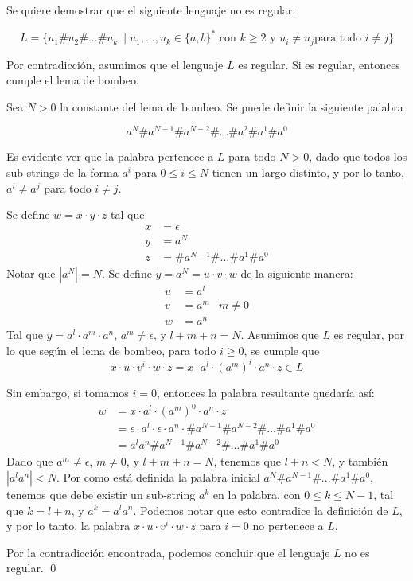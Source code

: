 \documentclass[letter]{article}
\begin{document}
\begin{pregunta}{2}
Se quiere demostrar que el siguiente lenguaje no es regular:

$$L = \{u_1\#u_2\# ... \#u_k \| u_1, ..., u_k \in \{a, b\}^* \text{ con } k \geq 2 \text{ y } u_i \neq u_j \text{para todo } i \neq j \}$$

Por contradicción, asumimos que el lenguaje $L$ es regular. Si es regular, entonces cumple el lema de bombeo.

Sea $N > 0$ la constante del lema de bombeo. Se puede definir la siguiente palabra

$$a^N \# a^{N - 1} \# a^{N - 2} \# ... \# a^2 \# a^1 \# a^0$$

Es evidente ver que la palabra pertenece a $L$ para todo $N > 0$, dado que todos los sub-strings de la forma $a^i$ para $0 \leq i \leq N$ tienen un largo distinto, y por lo tanto, $a^i \neq a^j$ para todo $i \neq j$.

Se define $w = x \cdot y \cdot z$ tal que
\begin{align*}
    x &= \epsilon \\
    y &= a^N \\
    z &= \# a^{N-1} \# ... \# a^1 \# a^0
\end{align*}
Notar que $|a^N| = N$. Se define $y = a^N = u \cdot v \cdot w$ de la siguiente manera:
\begin{align*}
    u &= a^l \\
    v &= a^m & m \neq 0 \\
    w &= a^n
\end{align*}
Tal que $y = a^l \cdot a^m \cdot a^n$, $a^m \neq \epsilon$, y $l + m + n = N$. Asumimos que $L$ es regular, por lo que según el lema de bombeo, para todo $i \geq 0$, se cumple que
$$x \cdot u \cdot v^i \cdot w \cdot z = x \cdot a^l \cdot (a^m)^i \cdot a^n \cdot z \in L$$

Sin embargo, si tomamos $i = 0$, entonces la palabra resultante quedaría así:
\begin{align*}
    w &= x \cdot a^l \cdot (a^m)^0 \cdot a^n \cdot z \\
    &= \epsilon \cdot a^l \cdot \epsilon \cdot a^n \cdot \# a^{N-1} \# a^{N-2} \# ... \# a^1 \# a^0 \\
    &= a^l a^n \# a^{N-1} \# a^{N-2} \# ... \# a^1 \# a^0
\end{align*}
Dado que $a^m \neq \epsilon$, $m \neq 0$, y $l + m + n = N$, tenemos que $l + n < N$, y también $|a^l a^n| < N$. Por como está definida la palabra inicial $a^N \# a^{N-1} \# ... \# a^1 \# a^0$, tenemos que debe existir un sub-string $a^k$ en la palabra, con $0 \leq k \leq N - 1$, tal que $k = l + n$, y $a^k = a^l a^n$. Podemos notar que esto contradice la definición de $L$, y por lo tanto, la palabra $x \cdot u \cdot v^i \cdot w \cdot z$ para $i = 0$ no pertenece a $L$.

Por la contradicción encontrada, podemos concluir que el lenguaje $L$ no es regular. \qed

\end{pregunta}
\end{document}

